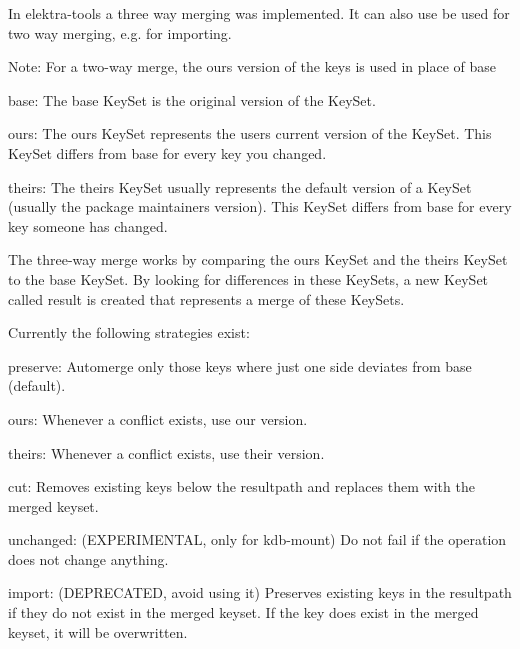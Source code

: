 In elektra-\/tools a three way merging was implemented. It can also use be used for two way merging, e.\+g. for importing.

Note\+: For a two-\/way merge, the {\ttfamily ours} version of the keys is used in place of {\ttfamily base}


\begin{DoxyItemize}
\item {\ttfamily base}\+: The {\ttfamily base} Key\+Set is the original version of the Key\+Set.
\item {\ttfamily ours}\+: The {\ttfamily ours} Key\+Set represents the user\textquotesingle{}s current version of the Key\+Set. This Key\+Set differs from {\ttfamily base} for every key you changed.
\item {\ttfamily theirs}\+: The {\ttfamily theirs} Key\+Set usually represents the default version of a Key\+Set (usually the package maintainer\textquotesingle{}s version). This Key\+Set differs from {\ttfamily base} for every key someone has changed.
\end{DoxyItemize}

The three-\/way merge works by comparing the {\ttfamily ours} Key\+Set and the {\ttfamily theirs} Key\+Set to the {\ttfamily base} Key\+Set. By looking for differences in these Key\+Sets, a new Key\+Set called {\ttfamily result} is created that represents a merge of these Key\+Sets.

Currently the following strategies exist\+:


\begin{DoxyItemize}
\item preserve\+: Automerge only those keys where just one side deviates from base (default).
\item ours\+: Whenever a conflict exists, use our version.
\item theirs\+: Whenever a conflict exists, use their version.
\item cut\+: Removes existing keys below the resultpath and replaces them with the merged keyset.
\item unchanged\+: (E\+X\+P\+E\+R\+I\+M\+E\+N\+T\+AL, only for kdb-\/mount) Do not fail if the operation does not change anything.
\item import\+: (D\+E\+P\+R\+E\+C\+A\+T\+ED, avoid using it) Preserves existing keys in the resultpath if they do not exist in the merged keyset. If the key does exist in the merged keyset, it will be overwritten. 
\end{DoxyItemize}